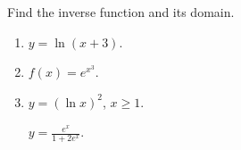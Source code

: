 Find the inverse function and its domain. 
\begin{enumerate}[ref={\fcProblemRef}]
\item  \label{problemFindInversey=ln(x+3)} $y=\ln (x+3)$.

\item  $f(x)=e^{x^3}$.


\item \label{problemFindInversey=(lnx)^2} $y=(\ln x)^2$, $x\geq 1$.


 \label{problemFindInversey=e^x/(1+2e^x)}  $y=\frac{e^x}{1+2e^x}$.

\end{enumerate}
